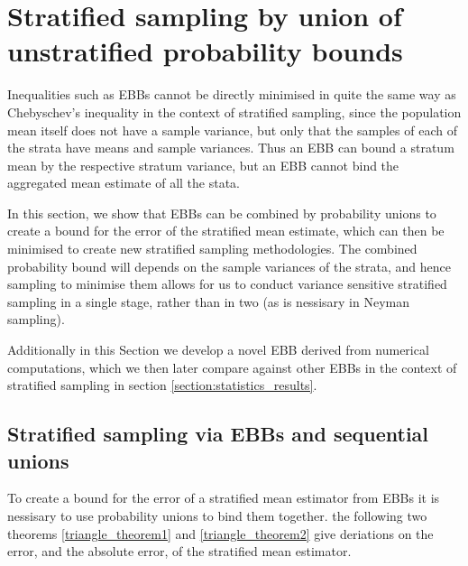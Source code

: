 \section{Stratified sampling by union of unstratified probability bounds}\label{section:old_statistics}

Inequalities such as EBBs cannot be directly minimised in quite the same way as Chebyschev's inequality in the context of stratified sampling, since the population mean itself does not have a sample variance, but only that the samples of each of the strata have means and sample variances.
Thus an EBB can bound a stratum mean by the respective stratum variance, but an EBB cannot bind the aggregated mean estimate of all the stata.

In this section, we show that EBBs can be combined by probability unions to create a bound for the error of the stratified mean estimate, which can then be minimised to create new stratified sampling methodologies.
The combined probability bound will depends on the sample variances of the strata, and hence sampling to minimise them allows for us to conduct variance sensitive stratified sampling in a single stage, rather than in two (as is nessisary in Neyman sampling).

Additionally in this Section we develop a novel EBB derived from numerical computations, which we then later compare against other EBBs in the context of stratified sampling in section \ref{section:statistics_results}.


\subsection{Stratified sampling via EBBs and sequential unions}\label{section:unionising_ebbs}

To create a bound for the error of a stratified mean estimator from EBBs it is nessisary to use probability unions to bind them together.
the following two theorems \ref{triangle_theorem1} and \ref{triangle_theorem2} give deriations on the error, and the absolute error, of the stratified mean estimator.

